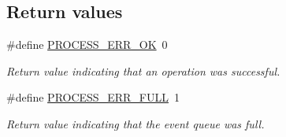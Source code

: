\subsection*{Return values}
\begin{DoxyCompactItemize}
\item 
\#define \hyperlink{group__process_gab8b88e679094ca4b95deb8ee8320802b}{P\-R\-O\-C\-E\-S\-S\-\_\-\-E\-R\-R\-\_\-\-O\-K}~0
\begin{DoxyCompactList}\small\item\em Return value indicating that an operation was successful. \end{DoxyCompactList}\item 
\#define \hyperlink{group__process_gaf73c4e16f7db2731761680c84e18bf37}{P\-R\-O\-C\-E\-S\-S\-\_\-\-E\-R\-R\-\_\-\-F\-U\-L\-L}~1
\begin{DoxyCompactList}\small\item\em Return value indicating that the event queue was full. \end{DoxyCompactList}\end{DoxyCompactItemize}
